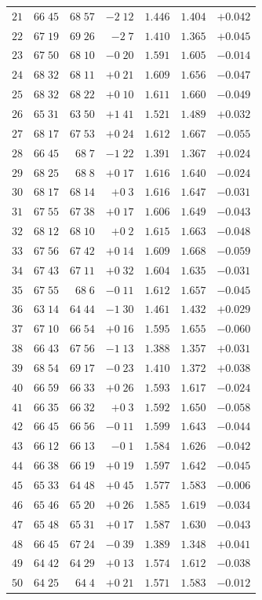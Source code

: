 \begin{center}
{{\begin{tabular}{r||r|r|r||r|r|r}
$21$&$66\;45$&$68\;57$&$-2\;12$&$1.446$&$1.404$&$+0.042$\\
$22$&$67\;19$&$69\;26$&$-2\;7$&$1.410$&$1.365$&$+0.045$\\
$23$&$67\;50$&$68\;10$&$-0\;20$&$1.591$&$1.605$&$-0.014$\\
$24$&$68\;32$&$68\;11$&$+0\;21$&$1.609$&$1.656$&$-0.047$\\
$25$&$68\;32$&$68\;22$&$+0\;10$&$1.611$&$1.660$&$-0.049$\\
$26$&$65\;31$&$63\;50$&$+1\;41$&$1.521$&$1.489$&$+0.032$\\
$27$&$68\;17$&$67\;53$&$+0\;24$&$1.612$&$1.667$&$-0.055$\\
$28$&$66\;45$&$68\;7$&$-1\;22$&$1.391$&$1.367$&$+0.024$\\
$29$&$68\;25$&$68\;8$&$+0\;17$&$1.616$&$1.640$&$-0.024$\\
$30$&$68\;17$&$68\;14$&$+0\;3$&$1.616$&$1.647$&$-0.031$\\[2pt]
$31$&$67\;55$&$67\;38$&$+0\;17$&$1.606$&$1.649$&$-0.043$\\
$32$&$68\;12$&$68\;10$&$+0\;2$&$1.615$&$1.663$&$-0.048$\\
$33$&$67\;56$&$67\;42$&$+0\;14$&$1.609$&$1.668$&$-0.059$\\
$34$&$67\;43$&$67\;11$&$+0\;32$&$1.604$&$1.635$&$-0.031$\\
$35$&$67\;55$&$68\;6$&$-0\;11$&$1.612$&$1.657$&$-0.045$\\
$36$&$63\;14$&$64\;44$&$-1\;30$&$1.461$&$1.432$&$+0.029$\\
$37$&$67\;10$&$66\;54$&$+0\;16$&$1.595$&$1.655$&$-0.060$\\
$38$&$66\;43$&$67\;56$&$-1\;13$&$1.388$&$1.357$&$+0.031$\\
$39$&$68\;54$&$69\;17$&$-0\;23$&$1.410$&$1.372$&$+0.038$\\
$40$&$66\;59$&$66\;33$&$+0\;26$&$1.593$&$1.617$&$-0.024$\\[2pt]
$41$&$66\;35$&$66\;32$&$+0\;3$&$1.592$&$1.650$&$-0.058$\\
$42$&$66\;45$&$66\;56$&$-0\;11$&$1.599$&$1.643$&$-0.044$\\
$43$&$66\;12$&$66\;13$&$-0\;1$&$1.584$&$1.626$&$-0.042$\\
$44$&$66\;38$&$66\;19$&$+0\;19$&$1.597$&$1.642$&$-0.045$\\
$45$&$65\;33$&$64\;48$&$+0\;45$&$1.577$&$1.583$&$-0.006$\\
$46$&$65\;46$&$65\;20$&$+0\;26$&$1.585$&$1.619$&$-0.034$\\
$47$&$65\;48$&$65\;31$&$+0\;17$&$1.587$&$1.630$&$-0.043$\\
$48$&$66\;45$&$67\;24$&$-0\;39$&$1.389$&$1.348$&$+0.041$\\
$49$&$64\;42$&$64\;29$&$+0\;13$&$1.574$&$1.612$&$-0.038$\\
$50$&$64\;25$&$64\;4$&$+0\;21$&$1.571$&$1.583$&$-0.012$\\
\end{tabular}
}
}
\end{center}
\endgroup

